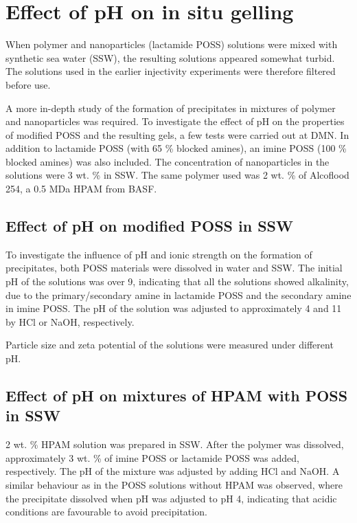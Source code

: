 \section{Effect of pH on in situ gelling}

When polymer and nanoparticles (lactamide POSS) solutions were mixed with synthetic sea water (SSW), the resulting solutions appeared somewhat turbid. The solutions used in the earlier injectivity experiments were therefore filtered before use. 

A more in-depth study of the formation of precipitates in mixtures of polymer and nanoparticles was required. To investigate the effect of pH on the properties of modified POSS and the resulting gels, a few tests were carried out at DMN. In addition to lactamide POSS (with 65 \% blocked amines), an imine POSS (100 \% blocked amines) was also included. The concentration of nanoparticles in the solutions were 3 wt. \% in SSW. The same polymer used was 2 wt. \% of Alcoflood 254, a 0.5 MDa HPAM from BASF.


\subsection{Effect of pH on modified POSS in SSW}
To investigate the influence of pH and ionic strength on the formation of precipitates, both POSS materials were dissolved in water and SSW. The initial pH of the solutions was over 9, indicating that all the solutions showed alkalinity, due to the primary/secondary amine in lactamide POSS and the secondary amine in imine POSS. The pH of the solution was adjusted to approximately 4 and 11 by HCl or NaOH, respectively.

Particle size and zeta potential of the solutions were measured under different pH.

\subsection{Effect of pH on mixtures of HPAM with POSS in SSW}
2 wt. \% HPAM solution was prepared in SSW. After the polymer was dissolved, approximately 3 wt. \% of imine POSS or lactamide POSS was added, respectively. The pH of the mixture was adjusted by adding HCl and NaOH. A similar behaviour as in the POSS solutions without HPAM was observed, where the precipitate dissolved when pH was adjusted to pH 4, indicating that acidic conditions are favourable to avoid precipitation.  

